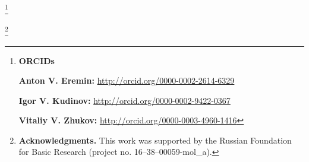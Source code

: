 \RuDate



\newpage





\makeentitle





\thanks{{\bf ORCIDs}



{\bf Anton V. Eremin:} \url{http://orcid.org/0000-0002-2614-6329}



{\bf Igor V. Kudinov:} \url{http://orcid.org/0000-0002-9422-0367}



{\bf Vitaliy V. Zhukov:} \url{http://orcid.org/0000-0003-4960-1416}



}



\thanks{{\bf Acknowledgments.} This work was supported by the Russian Foundation for Basic Research (project no. 16--38--00059-mol\_a).}



\EngRef



